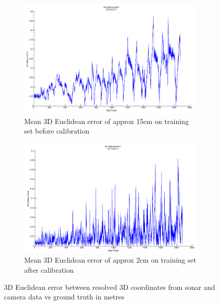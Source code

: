 \documentclass[15pt]{article}
\begin{document}
\begin{figure}[!htbp]
\centering
\begin{subfigure}{\columnwidth}
\includegraphics[width=\columnwidth]{3}%
\caption{Mean 3D Euclidean error of approx 15cm on training set before calibration}%
\label{subfiga}%
\end{subfigure}\hfill%
\begin{subfigure}{\columnwidth}
\includegraphics[width=\columnwidth]{6}%
\caption{Mean 3D Euclidean error of approx 2cm on training set after calibration}%
\label{subfiga}%
\end{subfigure}\hfill%
\caption{3D Euclidean error between resolved 3D coordinates from sonar and camera data vs ground truth in metres}
\label{figabc}
\end{figure}
\end{document}
